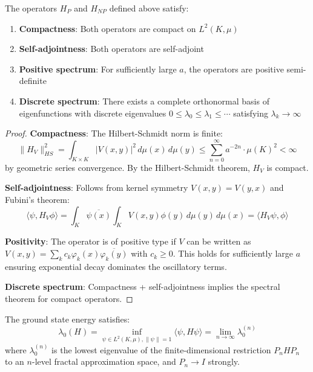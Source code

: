 \begin{theorem}\label{thm:spectral-properties}
The operators $H_P$ and $H_{NP}$ defined above satisfy:
\begin{enumerate}
\item \textbf{Compactness}: Both operators are compact on $L^2(K,\mu)$
\item \textbf{Self-adjointness}: Both operators are self-adjoint
\item \textbf{Positive spectrum}: For sufficiently large $a$, the operators are positive semi-definite
\item \textbf{Discrete spectrum}: There exists a complete orthonormal basis of eigenfunctions with discrete eigenvalues $0 \leq \lambda_0 \leq \lambda_1 \leq \cdots$ satisfying $\lambda_k \to \infty$
\end{enumerate}
\end{theorem}

\begin{proof}
\textbf{Compactness}: The Hilbert-Schmidt norm is finite:
\begin{equation}
\|H_V\|_{HS}^2 = \int_{K\times K} |V(x,y)|^2\, d\mu(x)\, d\mu(y) \leq \sum_{n=0}^\infty a^{-2n} \cdot \mu(K)^2 < \infty
\end{equation}
by geometric series convergence. By the Hilbert-Schmidt theorem, $H_V$ is compact\cite{reed1980}.

\textbf{Self-adjointness}: Follows from kernel symmetry $V(x,y) = V(y,x)$ and Fubini's theorem:
\begin{equation}
\langle \psi, H_V\phi \rangle = \int_K \overline{\psi(x)} \int_K V(x,y)\phi(y)\, d\mu(y)\, d\mu(x) = \langle H_V\psi, \phi \rangle
\end{equation}

\textbf{Positivity}: The operator is of positive type if $V$ can be written as $V(x,y) = \sum_k c_k \varphi_k(x)\overline{\varphi_k(y)}$ with $c_k \geq 0$. This holds for sufficiently large $a$ ensuring exponential decay dominates the oscillatory terms\cite{gelfand1964generalized}.

\textbf{Discrete spectrum}: Compactness + self-adjointness implies the spectral theorem for compact operators\cite{reed1980}.
\end{proof}

\begin{theorem}\label{thm:variational}
The ground state energy satisfies:
\begin{equation}
\lambda_0(H) = \inf_{\psi \in L^2(K,\mu), \|\psi\|=1} \langle \psi, H\psi \rangle = \lim_{n \to \infty} \lambda_0^{(n)}
\end{equation}
where $\lambda_0^{(n)}$ is the lowest eigenvalue of the finite-dimensional restriction $P_n H P_n$ to an $n$-level fractal approximation space, and $P_n \to I$ strongly.
\end{theorem}

